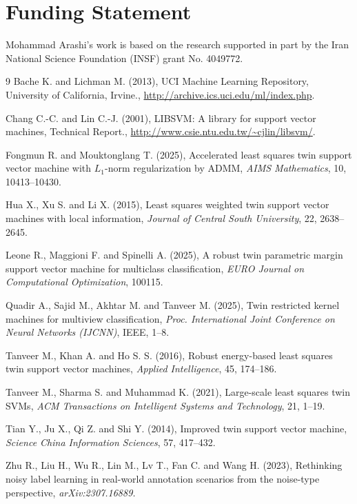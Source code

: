 \documentclass[twoside]{article}
\begin{document}
\section*{Funding Statement}   
Mohammad Arashi's work is based on the research supported in part by the Iran National Science Foundation (INSF) grant No. 4049772.

\begin{thebibliography}{9}
Bache K. and Lichman M. (2013), UCI Machine Learning Repository, University of California, Irvine., \url{http://archive.ics.uci.edu/ml/index.php}.

Chang C.-C. and Lin C.-J. (2001), LIBSVM: A library for support vector machines, Technical Report., \url{http://www.csie.ntu.edu.tw/~cjlin/libsvm/}.

Fongmun R. and Mouktonglang T. (2025), Accelerated least squares twin support vector machine with $L_1$-norm regularization by ADMM, {\it AIMS Mathematics}, 10, 10413–10430.

Hua X., Xu S. and Li X. (2015), Least squares weighted twin support vector machines with local information, {\it Journal of Central South University}, 22, 2638–2645.

Leone R., Maggioni F. and Spinelli A. (2025), A robust twin parametric margin support vector machine for multiclass classification, {\it EURO Journal on Computational Optimization}, 100115.

Quadir A., Sajid M., Akhtar M. and Tanveer M. (2025), Twin restricted kernel machines for multiview classification, {\it Proc. International Joint Conference on Neural Networks (IJCNN)}, IEEE, 1–8.

Tanveer M., Khan A. and Ho S. S. (2016), Robust energy-based least squares twin support vector machines, {\it Applied Intelligence}, 45, 174–186.

Tanveer M., Sharma S. and Muhammad K. (2021), Large-scale least squares twin SVMs, {\it ACM Transactions on Intelligent Systems and Technology}, 21, 1–19.

Tian Y., Ju X., Qi Z. and Shi Y. (2014), Improved twin support vector machine, {\it Science China Information Sciences}, 57, 417–432.

Zhu R., Liu H., Wu R., Lin M., Lv T., Fan C. and Wang H. (2023), Rethinking noisy label learning in real-world annotation scenarios from the noise-type perspective, {\it arXiv:2307.16889.}

\end{thebibliography}
 
\end{document}
